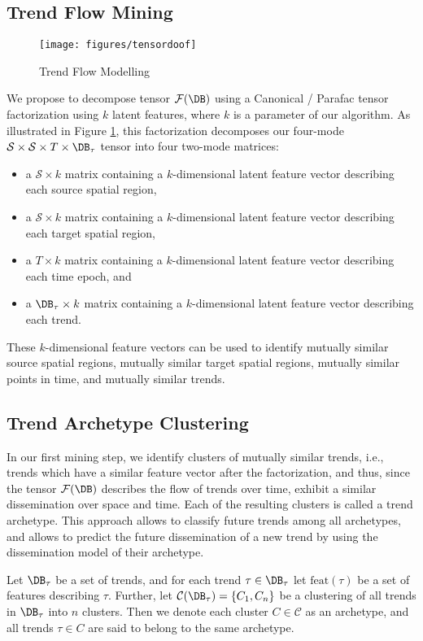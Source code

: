 \subsection{Trend Flow Mining}
\begin{figure}[t]
	\centering
\texttt{[image: figures/tensordoof]}
    \caption{Trend Flow Modelling}
    \label{fig:tensordoof}
    \vspace{-0em}
\end{figure}
We propose to decompose tensor $\mathcal{F}(\DB)$ using a Canonical / Parafac
tensor factorization \cite{?} using $k$ latent features, where $k$ is a parameter of our algorithm. As illustrated in Figure \ref{fig:tensordoof}, this factorization decomposes our four-mode $\mathcal{S}\times \mathcal{S} \times T \times \DB_\tau$ tensor into four two-mode matrices:
\begin{itemize}
\item a $\mathcal{S}\times k$ matrix containing a $k$-dimensional latent feature vector describing each source spatial region,
\item a $\mathcal{S}\times k$ matrix containing a $k$-dimensional latent feature vector describing each target spatial region,
\item a $T\times k$ matrix containing a $k$-dimensional latent feature vector describing each time epoch, and
\item a $\DB_\tau\times k$ matrix containing a $k$-dimensional latent feature vector describing each trend.
\end{itemize} 
These $k$-dimensional feature vectors can be used to identify mutually similar source spatial regions, mutually similar target spatial regions, mutually similar points in time, and mutually similar trends. 
\subsection{Trend Archetype Clustering}\label{subsec:trendclustering}
In our first mining step, we identify clusters of mutually similar trends, i.e., trends which have a similar feature vector after the factorization, and thus, since the tensor $\mathcal{F}(\DB)$ describes the flow of trends over time, exhibit a similar dissemination over space and time. Each of the resulting clusters is called a trend archetype. This approach allows to classify future trends among all archetypes, and allows to predict the future dissemination of a new trend by using the dissemination model of their archetype.
\begin{definition}
Let $\DB_\tau$ be a set of trends, and for each trend $\tau\in\DB_\tau$ let $\mbox{feat}(\tau)$ be a set of features describing $\tau$. Further, let $\mathcal{C}(\DB_\tau)=\{C_1,C_n\}$ be a clustering of all trends in $\DB_\tau$ into $n$ clusters. Then we denote each cluster $C\in\mathcal{C}$ as an archetype, and all trends $\tau\in C$ are said to belong to the same archetype.
\end{definition}

